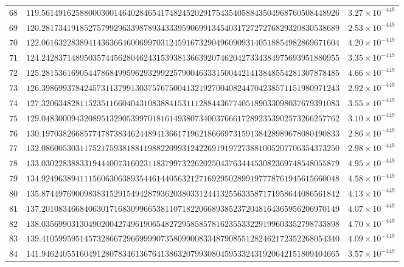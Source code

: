 \documentclass[12pt,reqno]{amsart}
\theoremstyle{plain}
\theoremstyle{definition}
\theoremstyle{remark}
\begin{document}
\begin{longtable}{clc}
$68$ & $119.5614916258800030014640284654174824520291754354058843504968760508448926$ & $3.27 \times 10^{-449}$ \\
$69$ & $120.2817341918527579929633987893433395906991345403172727276829320830538689$ & $2.53 \times 10^{-449}$ \\
$70$ & $122.0616322838941436366460069970312459167329049609093140518854982869671604$ & $4.20 \times 10^{-449}$ \\
$71$ & $124.2428371489503574456280462431539381366392074620427334384975693951880955$ & $3.35 \times 10^{-449}$ \\
$72$ & $125.2815361690544786849959629329922579004633315004421413848554281307878485$ & $4.66 \times 10^{-449}$ \\
$73$ & $126.3986993784245731137991303757675004132192700408244704238571151980971243$ & $2.92 \times 10^{-449}$ \\
$74$ & $127.3206348281152351166040431083884153111288443677405189033098037679391083$ & $3.55 \times 10^{-449}$ \\
$75$ & $129.0483000943208951329053997018161493807340037666172892353902573266257762$ & $3.10 \times 10^{-449}$ \\
$76$ & $130.1970382668577478738346244894136617196218666973159138428989678080490833$ & $2.86 \times 10^{-449}$ \\
$77$ & $132.0860053031175217593818811988220993124226919197273881005207706354373250$ & $2.98 \times 10^{-449}$ \\
$78$ & $133.0302283883319444007316023118379973226202504376344453082369748548055879$ & $4.95 \times 10^{-449}$ \\
$79$ & $134.9249638941115606306389354461440563212716929502899197778761945615660048$ & $4.58 \times 10^{-449}$ \\
$80$ & $135.8744976900983831529154942879362038033124413255633587171958644086561842$ & $4.13 \times 10^{-449}$ \\
$81$ & $137.2010834668406301716830996653811071822066893852372048164365956206970149$ & $4.07 \times 10^{-449}$ \\
$82$ & $138.0356990313049020042749619065482729585857816235533229199603352798733898$ & $4.70 \times 10^{-449}$ \\
$83$ & $139.4105995951457328667296699990735809900833487908551282462172352268054340$ & $4.09 \times 10^{-449}$ \\
$84$ & $141.9462405516049128078346136764138632079930804595332431920642151809404665$ & $3.57 \times 10^{-449}$ \\

\end{longtable}
\end{document}
